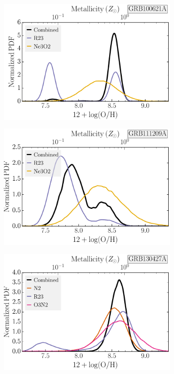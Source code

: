 \documentclass[traditabstract, longauth]{aa}
\begin{document}
\begin{appendix}
\begin{figure}
\begin{subfigure}{.33\textwidth}
\end{subfigure}
\begin{subfigure}{.33\textwidth}
  \includegraphics[width=0.999\linewidth]{Figs/GRB100621A_met_combined.pdf}
\end{subfigure}
\begin{subfigure}{.33\textwidth}
  \includegraphics[width=0.999\linewidth]{Figs/GRB111209A_met_combined.pdf}
\end{subfigure}
\begin{subfigure}{.33\textwidth}
  \includegraphics[width=0.999\linewidth]{Figs/GRB130427A_met_combined.pdf}

\end{subfigure}
\end{figure}
\end{appendix}
\end{document}

